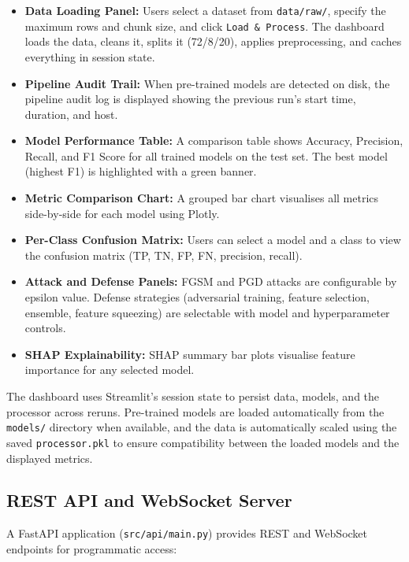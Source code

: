 \documentclass[12pt,a4paper,oneside]{report}
\begin{document}
\begin{itemize}
    \item \textbf{Data Loading Panel:} Users select a dataset from \texttt{data/raw/}, specify the maximum rows and chunk size, and click \texttt{Load \& Process}. The dashboard loads the data, cleans it, splits it (72/8/20), applies preprocessing, and caches everything in session state.
    \item \textbf{Pipeline Audit Trail:} When pre-trained models are detected on disk, the pipeline audit log is displayed showing the previous run's start time, duration, and host.
    \item \textbf{Model Performance Table:} A comparison table shows Accuracy, Precision, Recall, and F1 Score for all trained models on the test set. The best model (highest F1) is highlighted with a green banner.
    \item \textbf{Metric Comparison Chart:} A grouped bar chart visualises all metrics side-by-side for each model using Plotly.
    \item \textbf{Per-Class Confusion Matrix:} Users can select a model and a class to view the confusion matrix (TP, TN, FP, FN, precision, recall).
    \item \textbf{Attack and Defense Panels:} FGSM and PGD attacks are configurable by epsilon value. Defense strategies (adversarial training, feature selection, ensemble, feature squeezing) are selectable with model and hyperparameter controls.
    \item \textbf{SHAP Explainability:} SHAP summary bar plots visualise feature importance for any selected model.
\end{itemize}

The dashboard uses Streamlit's session state to persist data, models, and the processor across reruns. Pre-trained models are loaded automatically from the \texttt{models/} directory when available, and the data is automatically scaled using the saved \texttt{processor.pkl} to ensure compatibility between the loaded models and the displayed metrics.

\subsection{REST API and WebSocket Server}

A FastAPI application (\texttt{src/api/main.py}) provides REST and WebSocket endpoints for programmatic access:
\end{document}
